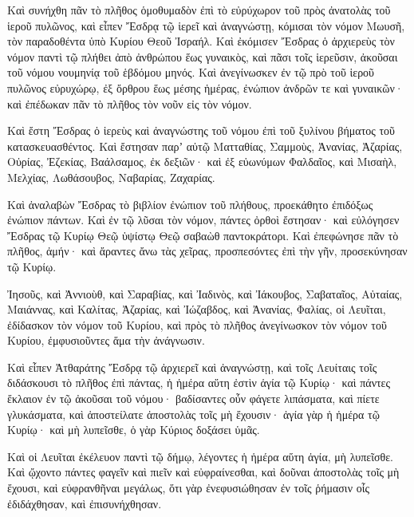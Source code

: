 {\par }{\PP {}Καὶ συνήχθη πᾶν τὸ πλῆθος ὁμοθυμαδὸν ἐπὶ τὸ εὐρύχωρον τοῦ πρὸς ἀνατολὰς τοῦ ἱεροῦ πυλῶνος,
καὶ εἶπεν Ἔσδρᾳ τῷ ἱερεῖ καὶ ἀναγνώστῃ, κόμισαι τὸν νόμον Μωυσῆ, τὸν παραδοθέντα ὑπὸ Κυρίου Θεοῦ Ἰσραήλ.
Καὶ ἐκόμισεν Ἔσδρας ὁ ἀρχιερεὺς τὸν νόμον παντὶ τῷ πλήθει ἀπὸ ἀνθρώπου ἕως γυναικὸς, καὶ πᾶσι τοῖς ἱερεῦσιν, ἀκοῦσαι τοῦ νόμου νουμηνίᾳ τοῦ ἑβδόμου μηνός.
Καὶ ἀνεγίνωσκεν ἐν τῷ πρὸ τοῦ ἱεροῦ πυλῶνος εὐρυχώρῳ, ἐξ ὄρθρου ἕως μέσης ἡμέρας, ἐνώπιον ἀνδρῶν τε καὶ γυναικῶν· καὶ ἐπέδωκαν πᾶν τὸ πλῆθος τὸν νοῦν εἰς τὸν νόμον.
\par }{\PP {}Καὶ ἔστη Ἔσδρας ὁ ἱερεὺς καὶ ἀναγνώστης τοῦ νόμου ἐπὶ τοῦ ξυλίνου βήματος τοῦ κατασκευασθέντος.
Καὶ ἔστησαν παρʼ αὐτῷ Ματταθίας, Σαμμοὺς, Ἀνανίας, Ἀζαρίας, Οὐρίας, Ἐζεκίας, Βαάλσαμος, ἐκ δεξιῶν·
καὶ ἐξ εὐωνύμων Φαλδαῖος, καὶ Μισαὴλ, Μελχίας, Λωθάσουβος, Ναβαρίας, Ζαχαρίας.
\par }{\PP {}Καὶ ἀναλαβὼν Ἔσδρας τὸ βιβλίον ἐνώπιον τοῦ πλήθους, προεκάθητο ἐπιδόξως ἐνώπιον πάντων.
Καὶ ἐν τῷ λῦσαι τὸν νόμον, πάντες ὀρθοὶ ἔστησαν· καὶ εὐλόγησεν Ἔσδρας τῷ Κυρίῳ Θεῷ ὑψίστῳ Θεῷ σαβαὼθ παντοκράτορι.
Καὶ ἐπεφώνησε πᾶν τὸ πλῆθος, ἀμήν· καὶ ἄραντες ἄνω τὰς χεῖρας, προσπεσόντες ἐπὶ τὴν γῆν, προσεκύνησαν τῷ Κυρίῳ.
\par }{\PP {}Ἰησοῦς, καὶ Ἀννιοὺθ, καὶ Σαραβίας, καὶ Ἰαδινὸς, καὶ Ἰάκουβος, Σαβαταῖος, Αὐταίας, Μαιάννας, καὶ Καλίτας, Ἀζαρίας, καὶ Ἰώζαβδος, καὶ Ἀνανίας, Φαλίας, οἱ Λευῖται, ἐδίδασκον τὸν νόμον τοῦ Κυρίου, καὶ πρὸς τὸ πλῆθος ἀνεγίνωσκον τὸν νόμον τοῦ Κυρίου, ἐμφυσιοῦντες ἅμα τὴν ἀνάγνωσιν.
\par }{\PP {}Καὶ εἶπεν Ἀτθαράτης Ἔσδρᾳ τῷ ἀρχιερεῖ καὶ ἀναγνώστῃ, καὶ τοῖς Λευίταις τοῖς διδάσκουσι τὸ πλῆθος ἐπὶ πάντας,
ἡ ἡμέρα αὕτη ἐστὶν ἁγία τῷ Κυρίῳ· καὶ πάντες ἔκλαιον ἐν τῷ ἀκοῦσαι τοῦ νόμου·
βαδίσαντες οὖν φάγετε λιπάσματα, καὶ πίετε γλυκάσματα, καὶ ἀποστείλατε ἀποστολὰς τοῖς μὴ ἔχουσιν·
ἁγία γὰρ ἡ ἡμέρα τῷ Κυρίῳ· καὶ μὴ λυπεῖσθε, ὁ γὰρ Κύριος δοξάσει ὑμᾶς.
\par }{\PP {}Καὶ οἱ Λευῖται ἐκέλευον παντὶ τῷ δήμῳ, λέγοντες ἡ ἡμέρα αὕτη ἁγία, μὴ λυπεῖσθε.
Καὶ ᾤχοντο πάντες φαγεῖν καὶ πιεῖν καὶ εὐφραίνεσθαι, καὶ δοῦναι ἀποστολὰς τοῖς μὴ ἔχουσι, καὶ εὐφρανθῆναι μεγάλως,
ὅτι γὰρ ἐνεφυσιώθησαν ἐν τοῖς ῥήμασιν οἷς ἐδιδάχθησαν, καὶ ἐπισυνήχθησαν.
\par }